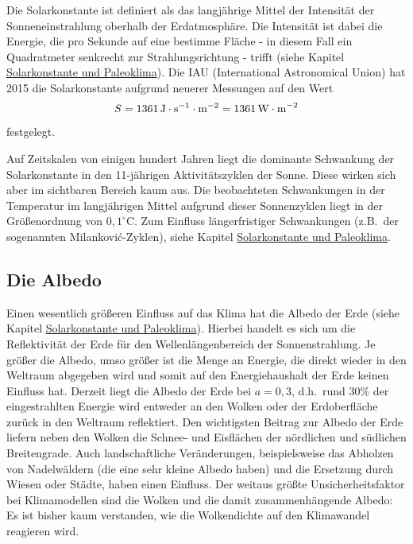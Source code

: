 Die Solarkonstante ist definiert als das langj\"ahrige Mittel der Intensit\"at der 
Sonneneinstrahlung oberhalb der Erdatmosph\"are. 
Die Intensit\"at ist dabei die Energie, die pro Sekunde 
auf eine bestimme Fl\"ache - in diesem Fall ein Quadratmeter senkrecht zur Strahlungsrichtung - trifft
(siehe Kapitel \hyperref[chap_Klima1]{Solarkonstante und Paleoklima}). 
Die IAU (International Astronomical Union) hat 2015 die Solarkonstante aufgrund neuerer
Messungen auf den Wert
\begin{equation}
               S = 1361\,{\rm J \cdot s^{-1} \cdot m^{-2}} = 1361\,{\rm W \cdot m}^{-2}  
\end{equation}
festgelegt.

Auf Zeitskalen von einigen hundert Jahren liegt die dominante Schwankung der Solarkonstante in
den 11-j\"ahrigen Aktivit\"atszyklen der Sonne. Diese wirken sich aber im sichtbaren Bereich
kaum aus. Die beobachteten Schwankungen in der Temperatur im langj\"ahrigen Mittel aufgrund
dieser Sonnenzyklen liegt in der Gr\"o\ss enordnung von $0,1^\circ$C. Zum Einfluss l\"angerfristiger
Schwankungen (z.B.\ der sogenannten Milankovi\'c-Zyklen), 
siehe Kapitel \hyperref[chap_Klima1]{Solarkonstante und Paleoklima}.

\subsection{Die Albedo}

Einen wesentlich gr\"o\ss eren Einfluss auf das Klima hat die Albedo
der Erde (siehe Kapitel \hyperref[chap_Klima1]{Solarkonstante und Paleoklima}). Hierbei handelt es sich um die Reflektivit\"at der
Erde f\"ur den Wellenl\"angenbereich der Sonnenstrahlung. Je gr\"o\ss er die Albedo, umso
gr\"o\ss er ist die Menge an Energie, die direkt wieder in den Weltraum abgegeben wird und
somit auf den Energiehaushalt der Erde keinen Einfluss hat. Derzeit liegt die Albedo der Erde
bei $a=0,3$, d.h.\ rund 30\% der eingestrahlten Energie wird entweder an den Wolken oder
der Erdoberfl\"ache zur\"uck in den Weltraum reflektiert. Den wichtigsten Beitrag zur Albedo der
Erde liefern neben den Wolken die Schnee- und Eisfl\"achen der n\"ordlichen und s\"udlichen
Breitengrade. Auch landschaftliche Ver\"anderungen, beispielsweise das Abholzen von Nadelw\"aldern
(die eine sehr kleine Albedo haben) und die Ersetzung durch Wiesen oder St\"adte, haben einen
Einfluss. Der weitaus gr\"o\ss te Unsicherheitsfaktor bei Klimamodellen sind die Wolken und die
damit zusammenh\"angende Albedo: Es ist bisher kaum verstanden, wie die Wolkendichte auf 
den Klimawandel reagieren wird.

